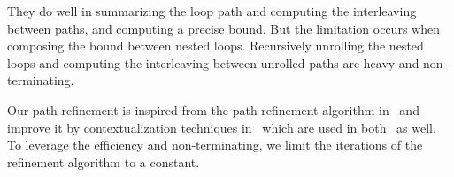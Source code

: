\begin{itemize}
They do well in summarizing the loop path and computing the interleaving between paths, and computing a precise bound.
But the limitation occurs when composing the bound between nested loops. Recursively unrolling the nested loops and computing the interleaving between unrolled paths are heavy and non-terminating.


Our path refinement is inspired from the path refinement algorithm in~\cite{GulwaniJK09} and improve it by contextualization techniques in~\cite{ManoliosV06} which are used in both~\cite{ZulegerGSV11,SinnZV14} as well. To leverage the efficiency and non-terminating,
we limit the iterations of the refinement algorithm to a constant.
\end{itemize}
